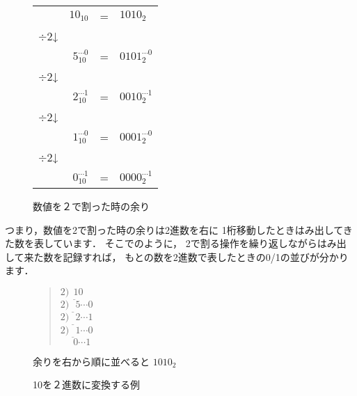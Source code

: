 \begin{figure}[tb]
\begin{center}{\small
\begin{tabular}{l r l l }
          & $10_{10}$ & = & $1010_2$                       \\
$\div 2$↓ &                   &                            \\
          & $5_{10}^{\cdots 0}$  & = & $0101_2^{\cdots 0}$ \\
$\div 2$↓ &                    &                           \\
          & $2_{10}^{\cdots 1}$  & = & $0010_2^{\cdots 1}$ \\
$\div 2$↓ &                    &                           \\
          & $1_{10}^{\cdots 0}$  & = & $0001_2^{\cdots 0}$ \\
$\div 2$↓ &                    &                           \\
          & $0_{10}^{\cdots 1}$  & = & $0000_2^{\cdots 1}$ \\
\end{tabular}}
\caption{数値を２で割った時の余り}
\label{fig:chap2:mod2}
\end{center}
\end{figure}

つまり，数値を2で割った時の余りは2進数を右に
1桁移動したときはみ出してきた数を表しています．
そこでのように，
2で割る操作を繰り返しながらはみ出して来た数を記録すれば，
もとの数を2進数で表したときの0/1の並びが分かります．

\begin{figure}[tb]
\begin{center}{\small
\begin{minipage}{0.5\columnwidth}
\begin{quote}
$2 \underline{) ~~10 } $\\
$2 \underline{) ~~~5  } {\cdots 0}$ \\
$2 \underline{) ~~~2  } {\cdots 1}$ \\
$2 \underline{) ~~~1  } {\cdots 0}$ \\
$~~            ~~~~0    {\cdots 1}$
\end{quote}
\end{minipage}
\begin{minipage}{0.4\columnwidth}
余りを右から順に並べると $1010_2$
\end{minipage}}
\caption{10を２進数に変換する例}
\label{fig:chap2:decToBin}
\end{center}
\end{figure}

